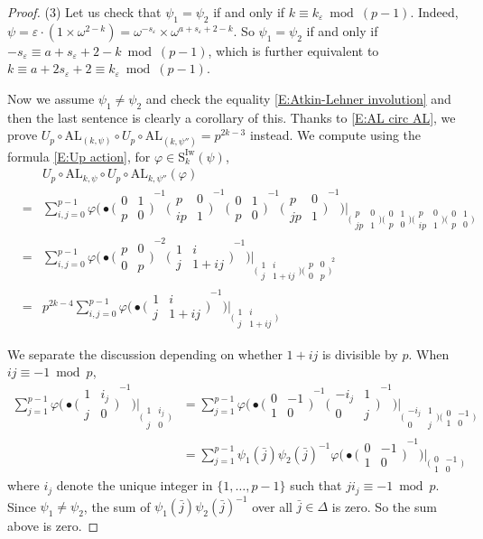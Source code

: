 \documentclass[12pt]{amsart}
\theoremstyle{definition}
\numberwithin{equation}{subsection}
\def\rmS{\mathrm{S}}
\newcommand{\AL}{\mathrm{AL}}
\newcommand{\Iw}{\mathrm{Iw}}
\newcommand{\Matrix}[4]{{\big(\begin{smallmatrix}#1&#2\\#3& #4\end{smallmatrix} \big)}}
\begin{document}
\begin{proof}
(3)
Let us check that $\psi_1 = \psi_2$ if and only if $k \equiv k_\varepsilon \bmod {(p-1)}$. Indeed, $\psi = \varepsilon \cdot (1\times \omega^{2-k}) = \omega^{-s_\varepsilon} \times \omega^{a+s_\varepsilon +2-k}$. So $\psi_1 = \psi_2 $ if and only if $-s_\varepsilon \equiv a+s_\varepsilon+2 -k \bmod{(p-1)}$, which is further equivalent to $k \equiv a+2s_\varepsilon +2\equiv k_\varepsilon \bmod{(p-1)}$.

Now we assume $\psi_1 \neq \psi_2$ and check the equality \eqref{E:Atkin-Lehner involution} and then the last sentence is clearly a corollary of this.
Thanks to \eqref{E:AL circ AL}, we prove $ U_p \circ \AL_{(k, \psi)} \circ U_p\circ \AL_{(k, \psi'')} = p^{2k-3}$ instead.
We compute using the formula \eqref{E:Up action}, for $\varphi \in \rmS_{k}^\Iw(\psi)$, 
\begin{eqnarray}
\label{E:U AL U AL computation}
&&U_p \circ \AL_{k, \psi} \circ U_p \circ  \AL_{k, \psi''} (\varphi)
\\
\nonumber
&=& \sum_{i,j  =0}^{p-1} \varphi \big(\bullet{\Matrix 01p0}^{-1} {\Matrix p0{ip} 1}^{-1} {\Matrix 01p0}^{-1} {\Matrix p0{jp}1}^{-1} \big) \big|_{{ \Matrix p0{jp} 1} \Matrix 01p0 {\Matrix p0{ip}1}\Matrix 01p0}
\\ \nonumber
&= & \sum_{i,j  =0}^{p-1} \varphi \big(\bullet {\Matrix p00p}^{-2} {\Matrix 1ij{1+ij}}^{-1} \big) \big|_{{ \Matrix 1ij{1+ij}{\Matrix p00p}}^2 }
\\ \nonumber
&= & p^{2k-4}\sum_{i,j  =0}^{p-1} \varphi \big(\bullet {\Matrix 1ij{1+ij}}^{-1} \big) \big|_{\Matrix 1ij{1+ij}}
\end{eqnarray}

We separate the discussion depending on whether $1+ij$ is divisible by $p$.
When $ij \equiv -1 \bmod p$, 
\begin{align*}
\sum_{ j = 1}^{p-1} \varphi  \big(\bullet {\Matrix 1{i_j}j0}^{-1} \big) \big|_{\Matrix 1{i_j} j0} &= \sum_{ j = 1}^{p-1} \varphi  \big(\bullet{\Matrix0{-1}10}^{-1} {\Matrix {-i_j}10j}^{-1} \big) \big|_{\Matrix {-i_j}10j \Matrix 0{-1}10} 
\\
&= \sum_{ j = 1}^{p-1} \psi_1(\bar j)\psi_2(\bar j)^{-1} \varphi  \big(\bullet{\Matrix0{-1}10}^{-1}\big) \big|_{\Matrix 0{-1}10} 
\end{align*}
where $i_j$ denote the unique integer in $\{1, \dots, p-1\}$ such that $j i_j \equiv -1 \bmod p$. Since $\psi_1 \neq \psi_2$, the sum of $\psi_1(\bar j) \psi_2(\bar j)^{-1}$ over all $\bar j  \in \Delta$ is zero. So the sum above is zero.


\end{proof}
\end{document}
